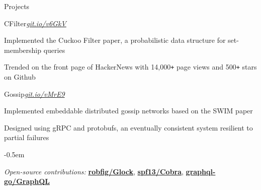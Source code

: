 \documentclass{resume} %
\begin{document}

\begin{rSection}{Projects}
  \begin{rSubsection}{CFilter}{\em{\href{https://git.io/v6GkV}{git.io/v6GkV}}}{}

    \item Implemented the Cuckoo Filter paper, a probabilistic data structure for
      set-membership queries
    \item Trended on the front page of HackerNews with 14,000\texttt{+} page
      views and 500\texttt{+} stars on Github
  \end{rSubsection}

  \begin{rSubsection}{Gossip}{\em{\href{https://git.io/vMrE9}{git.io/vMrE9}}}{}

    \item Implemented embeddable distributed gossip networks based on the SWIM
      paper
    \item Designed using gRPC and protobufs, an eventually consistent system
      resilient to partial failures
  \end{rSubsection}

  \begin{list}{}{\leftmargin=0.0em}
  \itemsep -0.5em \vspace{-0.0em}
  \item {\em Open-source contributions:}
    \href{https://github.com/robfig/glock}{\textbf{robfig/Glock}},
    \href{https://github.com/spf13/cobra}{\textbf{spf13/Cobra}},
    \href{https://github.com/graphql-go/graphql}{\textbf{graphql-go/GraphQL}}
  \end{list}
  \vspace{0.5em}




\end{rSection}
\end{document}
